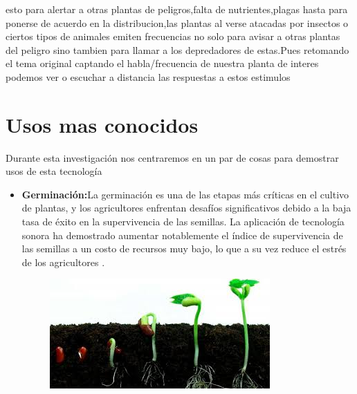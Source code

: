 \documentclass[twocolumn]{article}
\begin{document}
esto para alertar a otras plantas
de peligros,falta de nutrientes,plagas hasta para ponerse de acuerdo en la distribucion,las plantas 
al verse atacadas por insectos o ciertos tipos de animales emiten frecuencias no solo para avisar a otras plantas
del peligro sino tambien para llamar a los depredadores de estas.Pues retomando el tema original captando el habla/frecuencia 
de nuestra planta de interes podemos ver o escuchar a distancia las respuestas a estos estimulos

\section{Usos mas conocidos}
Durante esta investigación nos centraremos en un par de cosas para demostrar usos de esta tecnología
\begin{itemize}
    \item \textbf{Germinación:}La germinación es una de las etapas más críticas en el cultivo de plantas, y los agricultores enfrentan desafíos significativos debido a la baja tasa de éxito en la supervivencia de las semillas. La aplicación de tecnología sonora ha demostrado aumentar notablemente el índice de supervivencia de las semillas a un costo de recursos muy bajo, lo que a su vez reduce el estrés de los agricultores \cite{vicient2017}.
\begin{figure}[!h]
    \centering
    \includegraphics[width=\linewidth]{imagenes/descarga (9).jpeg}       
\end{figure}


\end{itemize}
\end{document}
